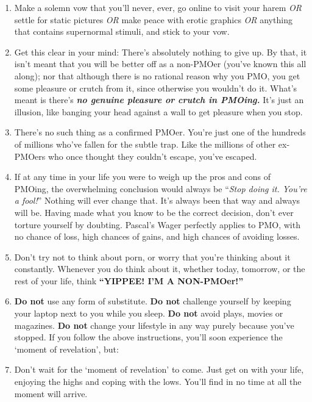 \documentclass[
]{book}
\begin{document}
\begin{enumerate}
\def\labelenumi{\arabic{enumi}.}
\item
  Make a solemn vow that you'll never, ever, go online to visit your harem \emph{OR} settle for static pictures \emph{OR} make peace with erotic graphics \emph{OR} anything that contains supernormal stimuli, and stick to your vow.
\item
  Get this clear in your mind: There's absolutely nothing to give up. By that, it isn't meant that you will be better off as a non-PMOer (you've known this all along); nor that although there is no rational reason why you PMO, you get some pleasure or crutch from it, since otherwise you wouldn't do it. What's meant is there's \textbf{\emph{no genuine pleasure or crutch in PMOing.}} It's just an illusion, like banging your head against a wall to get pleasure when you stop.
\item
  There's no such thing as a confirmed PMOer. You're just one of the hundreds of millions who've fallen for the subtle trap. Like the millions of other ex-PMOers who once thought they couldn't escape, you've escaped.
\item
  If at any time in your life you were to weigh up the pros and cons of PMOing, the overwhelming conclusion would always be ``\emph{Stop doing it. You're a fool!}'' Nothing will ever change that. It's always been that way and always will be. Having made what you know to be the correct decision, don't ever torture yourself by doubting. Pascal's Wager perfectly applies to PMO, with no chance of loss, high chances of gains, and high chances of avoiding losses.
\item
  Don't try not to think about porn, or worry that you're thinking about it constantly. Whenever you do think about it, whether today, tomorrow, or the rest of your life, think \textbf{``YIPPEE! I'M A NON-PMOer!''}
\item
  \textbf{Do not} use any form of substitute. \textbf{Do not} challenge yourself by keeping your laptop next to you while you sleep. \textbf{Do not} avoid plays, movies or magazines. \textbf{Do not} change your lifestyle in any way purely because you've stopped. If you follow the above instructions, you'll soon experience the `moment of revelation', but:
\item
  Don't wait for the `moment of revelation' to come. Just get on with your life, enjoying the highs and coping with the lows. You'll find in no time at all the moment will arrive.
\end{enumerate}
\end{document}
